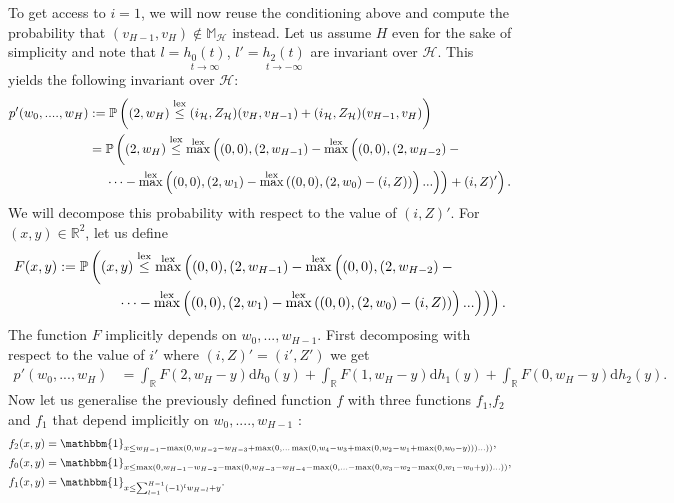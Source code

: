 \documentclass[11pt]{article}
\DeclareMathOperator{\lex}{lex}
\DeclareMathOperator*{\maxlex}{\overset{\lex}{\max}}
\begin{document}
To get access to $i=1$, we will now reuse the conditioning above and compute the probability that $(v_{H-1},v_H) \notin \mathbb{M}_{\mathcal{H}}$ instead. Let us assume $H$ even for the sake of simplicity and note that $l=\underset{t \rightarrow \infty}{h_0(t)}$, $l'=\underset{t \rightarrow -\infty}{h_2(t)}$  are invariant over ${\mathcal{H}}$. This yields the following invariant over ${\mathcal{H}}$:
\begin{align*}
    p'(w_0,....,w_H) &:=\mathbb{P}\left( (2,w_H)\overset{\lex}{\leq} (i_{\mathcal{H}},Z_{\mathcal{H}})(v_H,v_{H-1})+(i_{\mathcal{H}},Z_{\mathcal{H}})(v_{H-1},v_H) \right) \\
    &=\mathbb{P}\left( (2,w_H) \overset{\lex}{\leq} \maxlex\left((0,0),(2,w_{H-1})-\maxlex\left((0,0),(2,w_{H-2})- \vphantom{\maxlex} \right. \right. \right.\\
        & \quad \left.\left.\left. \cdots -\maxlex\left((0,0),(2,w_1)-\maxlex\left((0,0),(2,w_0)-(i,Z)\right) \right)... \right)  \right)  +(i,Z)'  \right).
\end{align*}
We will decompose this probability with respect to the value of $(i,Z)'$. For $(x,y) \in \mathbb{R}^2$, let us define 
\begin{align*}
F(x,y) & := \mathbb{P}\left( (x,y) \overset{\lex}{\leq} \maxlex\left((0,0),(2,w_{H-1})-\maxlex\left((0,0),(2,w_{H-2})- \vphantom{\maxlex} \right. \right. \right.\\
        & \qquad \qquad \left.\left.\left. \cdots -\maxlex\left((0,0),(2,w_1)-\maxlex\left((0,0),(2,w_0)-(i,Z)\right) \right)... \right)  \right)\right).
\end{align*}
The function $F$ implicitly depends on $w_0,...,w_{H-1}$. First decomposing with respect to the value of $i'$ where $(i,Z)'=(i',Z')$ we get
\begin{align*}
    p'(w_0,...,w_H)&= \int_{\mathbb{R}}F(2,w_H-y) \mathrm{d}h_0(y)
    +\int_{\mathbb{R}}F(1,w_H-y)\mathrm{d}h_1(y)
    +\int_{\mathbb{R}}F(0,w_H-y)\mathrm{d}h_2(y).
\end{align*}
Now let us generalise the previously defined function $f$ with three functions $f_1$,$f_2$ and $f_1$ that depend implicitly on $w_0,....,w_{H-1}$ :
\begin{align*}
    f_2(x,y)&=\mathbbm{1}_{x \leq w_{H-1}-\max(0, w_{H-2}-w_{H-3}+\max(0,... \max(0,w_4-w_3+ \max(0,w_2 -w_1+\max(0,w_0-y)))...))} ,\\
    f_0(x,y)&=\mathbbm{1}_{x \leq \max(0,w_{H-1}-w_{H-2}-\max(0,w_{H-3}-w_{H-4}-\max(0,... - \max(0,w_3-w_2-\max(0, w_1-w_0+y))...))}, \\
    f_1(x,y)&= \mathbbm{1}_{x \leq \sum_{l=1}^{H-1}(-1)^lw_{H-l}+y}.
\end{align*}
\end{document}
